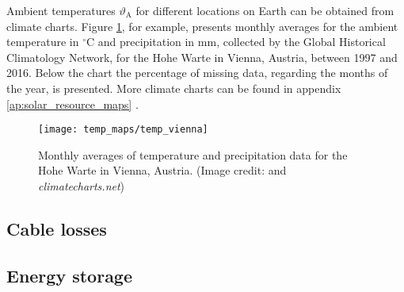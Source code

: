 Ambient temperatures $\vartheta_{\mathrm{A}}$ for different locations on Earth can be obtained from climate charts. Figure \ref{fig:temp_vienna}, for example, presents monthly averages for the ambient temperature in $^\circ \mathrm{C}$ and precipitation in $\mathrm{mm}$, collected by the Global Historical Climatology Network, for the Hohe Warte in Vienna, Austria, between 1997 and 2016. Below the chart the percentage of missing data, regarding the months of the year, is presented. More climate charts can be found in appendix \ref{ap:solar_resource_maps} \cite{Zepner:2020}.

\begin{figure}[h!]
	\centering
  	\texttt{[image: temp\_maps/temp\_vienna]}
  	\caption{Monthly averages of temperature and precipitation data for the Hohe Warte in Vienna, Austria. (Image credit: \cite{Zepner:2020} and \emph{climatecharts.net})}
	\label{fig:temp_vienna}
\end{figure}

%
%
%


\subsection{Cable losses}

%
%
%


\subsection{Energy storage}

